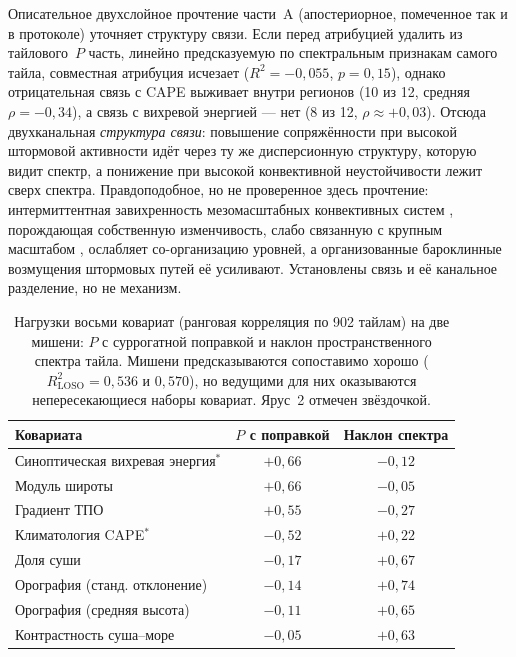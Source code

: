 \documentclass[11pt,a4paper]{article}
\begin{document}
Описательное двухслойное прочтение части~A (апостериорное, помеченное так и в протоколе) уточняет структуру связи. Если перед атрибуцией удалить из тайлового~$P$ часть, линейно предсказуемую по спектральным признакам самого тайла, совместная атрибуция исчезает ($R^2=-0{,}055$, $p=0{,}15$), однако отрицательная связь с CAPE выживает внутри регионов (10 из 12, средняя $\rho=-0{,}34$), а связь с вихревой энергией --- нет (8 из 12, $\rho\approx+0{,}03$). Отсюда двухканальная \emph{структура связи}: повышение сопряжённости при высокой штормовой активности идёт через ту же дисперсионную структуру, которую видит спектр, а понижение при высокой конвективной неустойчивости лежит сверх спектра. Правдоподобное, но не проверенное здесь прочтение: интермиттентная завихренность мезомасштабных конвективных систем \cite{Houze2004,Feng2021,PetersNeelin2006}, порождающая собственную изменчивость, слабо связанную с крупным масштабом \cite{Zhang2007,RotunnoSnyder2008,Judt2020}, ослабляет со-организацию уровней, а организованные бароклинные возмущения штормовых путей её усиливают. Установлены связь и её канальное разделение, но не механизм.

\begin{table}[t]
\centering
\caption{Нагрузки восьми ковариат (ранговая корреляция по 902 тайлам) на две мишени: $P$ с суррогатной поправкой и наклон пространственного спектра тайла. Мишени предсказываются сопоставимо хорошо ($R^2_{\mathrm{LOSO}}=0{,}536$ и $0{,}570$), но ведущими для них оказываются непересекающиеся наборы ковариат. Ярус~2 отмечен звёздочкой.}
\label{tab:loadings}
\small
\begin{tabular}{@{}lcc@{}}
\toprule
Ковариата & $P$ с поправкой & Наклон спектра\\
\midrule
Синоптическая вихревая энергия${}^{*}$ & $+0{,}66$ & $-0{,}12$\\
Модуль широты & $+0{,}66$ & $-0{,}05$\\
Градиент ТПО & $+0{,}55$ & $-0{,}27$\\
Климатология CAPE${}^{*}$ & $-0{,}52$ & $+0{,}22$\\
Доля суши & $-0{,}17$ & $+0{,}67$\\
Орография (станд. отклонение) & $-0{,}14$ & $+0{,}74$\\
Орография (средняя высота) & $-0{,}11$ & $+0{,}65$\\
Контрастность суша--море & $-0{,}05$ & $+0{,}63$\\
\bottomrule
\end{tabular}
\end{table}
\end{document}
